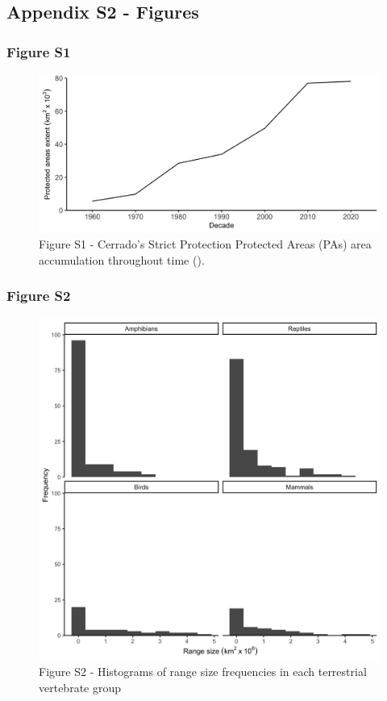 \documentclass[12pt,openright,oneside,a4paper,english]{abntex2}
\begin{document}
\pagebreak

\subsection*{Appendix S2 - Figures}\label{sup:1-s2}

\subsubsection*{Figure S1}\label{fig:fig1-s1}
\begin{figure}[H]
	\centering
	\includegraphics[width=160mm]{Fig c1-s1}
	\caption*{\small Figure S1 - Cerrado’s Strict Protection Protected Areas (PAs) area accumulation throughout time (\citealp[according to][]{UNEP-IUCN-PAs}).}
\end{figure}

\subsubsection*{Figure S2}\label{fig:fig1-s2}
\begin{figure}[H]
	\centering
	\includegraphics[width=160mm]{Fig c1-s2}
	\caption*{\small Figure S2 - Histograms of range size frequencies in each terrestrial vertebrate group}
\end{figure}
\end{document}
